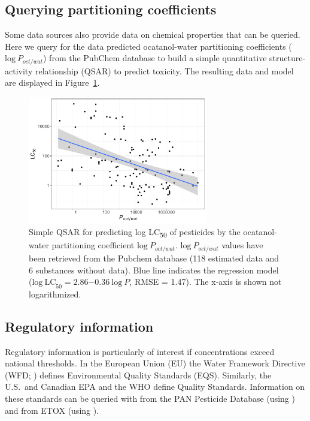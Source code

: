 \documentclass[article]{jss}
\begin{document}
\subsection[Querying partitioning coefficients]{Querying partitioning coefficients}
Some data sources also provide data on chemical properties that can be
queried. Here we query for the  data predicted ocatanol-water partitioning coefficients
($\mathrm{log}~\mathit{P_{oct/wat}}$) from the PubChem database to build a
simple quantitative structure-activity relationship (QSAR) to predict
toxicity. The resulting data and model are displayed in Figure~\ref{fig:fig3}.
%
\begin{CodeChunk}
\end{CodeChunk}
%

\begin{figure}[t!]
  \centering
  \includegraphics[width=0.7\textwidth]{plot_qsar-1} 
  \caption{Simple QSAR for predicting log LC\textsubscript{50} of
    pesticides by the ocatanol-water partitioning coefficient $\mathrm{log}~\mathit{P_{oct/wat}}$.
    $\mathrm{log}~\mathit{P_{oct/wat}}$ values have been retrieved from the Pubchem
    database (118 estimated data and 6 substances without data).  Blue line
    indicates the regression model
    ($\mathrm{log~LC}_{50} = 2.86\ensuremath{-0.36}~\mathrm{log}~P$,
    RMSE = 1.47). The x-axis is shown not logarithmized.}
\label{fig:fig3}
\end{figure}


\subsection[Regulatory information]{Regulatory information}
Regulatory information is particularly of interest if concentrations
exceed national thresholds.  In the European Union (EU) the Water
Framework Directive (WFD; \citealt{wfd2000directive}) defines
Environmental Quality Standards (EQS).  Similarly, the U.S.\ and
Canadian EPA and the WHO define Quality Standards.  Information on
these standards can be queried with  from the PAN
Pesticide Database (using ) and from ETOX (using
).
\end{document}
